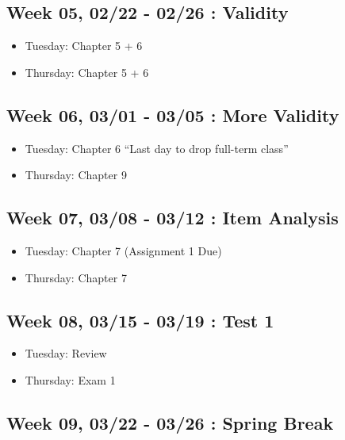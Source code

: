 \documentclass[11pt,]{article}
\providecommand{\tightlist}{%
  \setlength{\itemsep}{0pt}\setlength{\parskip}{0pt}}
\begin{document}
\hypertarget{week-05-0222---0226-validity}{%
\subsection{Week 05, 02/22 - 02/26 :
Validity}\label{week-05-0222---0226-validity}}

\begin{itemize}
\tightlist
\item
  Tuesday: Chapter 5 + 6
\item
  Thursday: Chapter 5 + 6
\end{itemize}

\hypertarget{week-06-0301---0305-more-validity}{%
\subsection{Week 06, 03/01 - 03/05 : More
Validity}\label{week-06-0301---0305-more-validity}}

\begin{itemize}
\tightlist
\item
  Tuesday: Chapter 6 ``Last day to drop full-term class''
\item
  Thursday: Chapter 9
\end{itemize}

\hypertarget{week-07-0308---0312-item-analysis}{%
\subsection{Week 07, 03/08 - 03/12 : Item
Analysis}\label{week-07-0308---0312-item-analysis}}

\begin{itemize}
\tightlist
\item
  Tuesday: Chapter 7 (Assignment 1 Due)
\item
  Thursday: Chapter 7
\end{itemize}

\hypertarget{week-08-0315---0319-test-1}{%
\subsection{Week 08, 03/15 - 03/19 : Test
1}\label{week-08-0315---0319-test-1}}

\begin{itemize}
\tightlist
\item
  Tuesday: Review
\item
  Thursday: Exam 1
\end{itemize}

\hypertarget{week-09-0322---0326-spring-break}{%
\subsection{Week 09, 03/22 - 03/26 : Spring
Break}\label{week-09-0322---0326-spring-break}}
\end{document}
